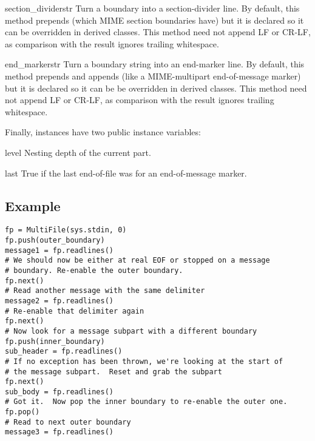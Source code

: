 \begin{methoddesc}{section_divider}{str}
Turn a boundary into a section-divider line.  By default, this
method prepends  (which MIME section boundaries have) but
it is declared so it can be overridden in derived classes.  This
method need not append LF or CR-LF, as comparison with the result
ignores trailing whitespace. 
\end{methoddesc}

\begin{methoddesc}{end_marker}{str}
Turn a boundary string into an end-marker line.  By default, this
method prepends  and appends  (like a
MIME-multipart end-of-message marker) but it is declared so it can be
be overridden in derived classes.  This method need not append LF or
CR-LF, as comparison with the result ignores trailing whitespace.
\end{methoddesc}

Finally,  instances have two public instance variables:

\begin{memberdesc}{level}
Nesting depth of the current part.
\end{memberdesc}

\begin{memberdesc}{last}
True if the last end-of-file was for an end-of-message marker. 
\end{memberdesc}


\subsection{ Example \label{multifile-example}}


\begin{verbatim}
fp = MultiFile(sys.stdin, 0)
fp.push(outer_boundary)
message1 = fp.readlines()
# We should now be either at real EOF or stopped on a message
# boundary. Re-enable the outer boundary.
fp.next()
# Read another message with the same delimiter
message2 = fp.readlines()
# Re-enable that delimiter again
fp.next()
# Now look for a message subpart with a different boundary
fp.push(inner_boundary)
sub_header = fp.readlines()
# If no exception has been thrown, we're looking at the start of
# the message subpart.  Reset and grab the subpart
fp.next()
sub_body = fp.readlines()
# Got it.  Now pop the inner boundary to re-enable the outer one.
fp.pop()
# Read to next outer boundary
message3 = fp.readlines()
\end{verbatim}

